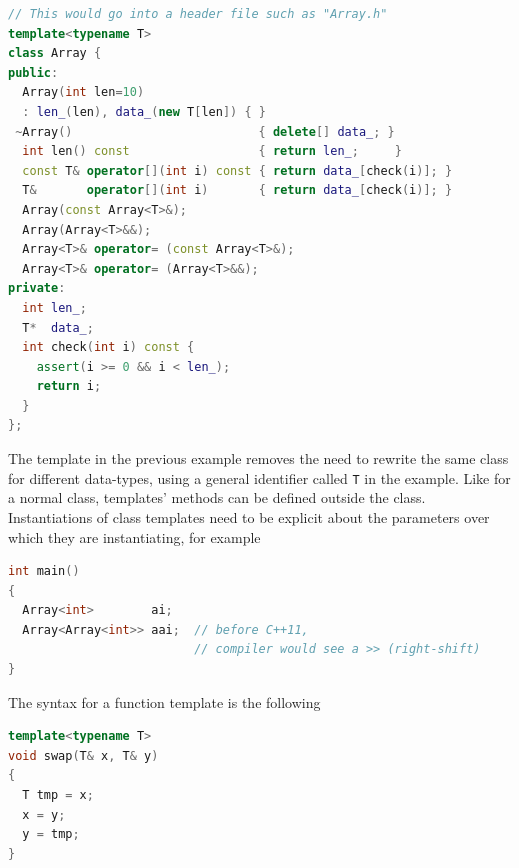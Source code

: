 \begin{lstlisting}[language=C++]
// This would go into a header file such as "Array.h"
template<typename T>
class Array {
public:
  Array(int len=10)                
  : len_(len), data_(new T[len]) { }
 ~Array()                          { delete[] data_; }
  int len() const                  { return len_;     }
  const T& operator[](int i) const { return data_[check(i)]; }
  T&       operator[](int i)       { return data_[check(i)]; }
  Array(const Array<T>&);
  Array(Array<T>&&);
  Array<T>& operator= (const Array<T>&);
  Array<T>& operator= (Array<T>&&);
private:
  int len_;
  T*  data_;
  int check(int i) const {
    assert(i >= 0 && i < len_);
    return i;
  }
};
\end{lstlisting}
The template in the previous example removes the need to rewrite the 
same class for different data-types, using a general identifier called 
\texttt{T} in the example.
\newline
Like for a normal class, templates' methods can be defined outside the 
class.
\newline
Instantiations of class templates need to be explicit about the parameters 
over which they are instantiating, for example
\begin{lstlisting}[language=C++]
int main()
{
  Array<int>        ai;
  Array<Array<int>> aai;  // before C++11, 
                          // compiler would see a >> (right-shift)
}
\end{lstlisting}

The syntax for a function template is the following
\begin{lstlisting}[language=C++]
template<typename T>
void swap(T& x, T& y)
{
  T tmp = x;
  x = y;
  y = tmp;
}
\end{lstlisting}

